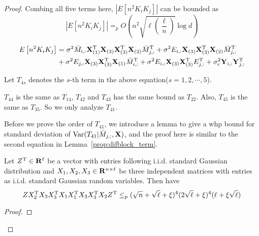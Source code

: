 \begin{proof}
Combing all five terms here, $\left|E\left[ n^2 K_i K_j \right]\right|$ can be bounded as
\begin{equation}
    \left|E\left[ n^2 K_i K_j \right] \right|
    =_p O\left(  n^2 \sqrt{\ell\left(\frac{\ell}{n} \right) } \log d \right)
\end{equation}



\begin{equation}
\begin{split}
    E\left[ n^2 K_i K_j\right] 
    &=  \sigma^2 \bar M_{i, :}\mathbf{X}_{(1)}^{\mathrm{T}}\mathbf{X}_{(3)}\mathbf{X}_{(3)}^{\mathrm{T}}\mathbf{X}_{(2)}\bar M^{\mathrm{T}}_{j, :}   + \sigma^2E_{i,:}\mathbf{X}_{(3)}\mathbf{X}^{\mathrm{T}}_{(3)}\mathbf{X}_{(2)}\bar M^{\mathrm{T}}_{j,:}  \\
    &+ \sigma^2E_{j,:}\mathbf{X}_{(3)}\mathbf{X}^{\mathrm{T}}_{(3)}\mathbf{X}_{(1)}\bar M^{\mathrm{T}}_{i,:}
    +\sigma^2 E_{i,:}\mathbf{X}_{(3)} \mathbf{X}_{(3)}^{\mathrm{T}} E^{\mathrm{T}}_{j,:} + \sigma^2_{\epsilon}\mathbf{Y}_{i,:}\mathbf{Y}^{\mathrm{T}}_{j,:}
\end{split}
\end{equation}

Let $T_{4s}$ denotes the $s$-th term in the above equation($s = 1,2,\cdots, 5$).

$T_{44}$ is the same as $T_{14}$, $T_{42}$ and $T_{43}$ has the same bound as $T_{22}$. Also, $T_{45}$ is the same as $T_{35}$. So we only analyze $T_{41}$.

Before we prove the order of $T_{41}$, we introduce a lemma to give a whp bound for standard deviation of $\mathrm{Var}(T_{41}|\bar M_{j,:},\mathbf{X})$, and the proof here is similar to the second equation in Lemma~\ref{prop:difblock_term}.
\begin{lemma} \label{prop: difblock_term2}

Let $Z^{\mathrm{T}} \in \mathbf{R}^{\ell}$ be a vector with entries following i.i.d. standard Gaussian distribution and $X_1, X_2, X_3 \in \mathbf{R}^{n\times \ell}$ be three independent matrices with entries as i.i.d. standard Gaussian random variables. Then have
\begin{equation}
    Z X_2^{\mathrm{T}}X_3X_3^{\mathrm{T}}X_1X_1^{\mathrm{T}}X_3X_3^{\mathrm{T}}X_2 Z^{\mathrm{T}}
    \leq_p (\sqrt{n} + \sqrt{\ell} + \xi)^{4}(2 \sqrt{\ell} + \xi)^{4}(\ell+\xi\sqrt{\ell})
\end{equation}
\end{lemma}

\begin{proof} %


\end{proof}
\end{proof}
